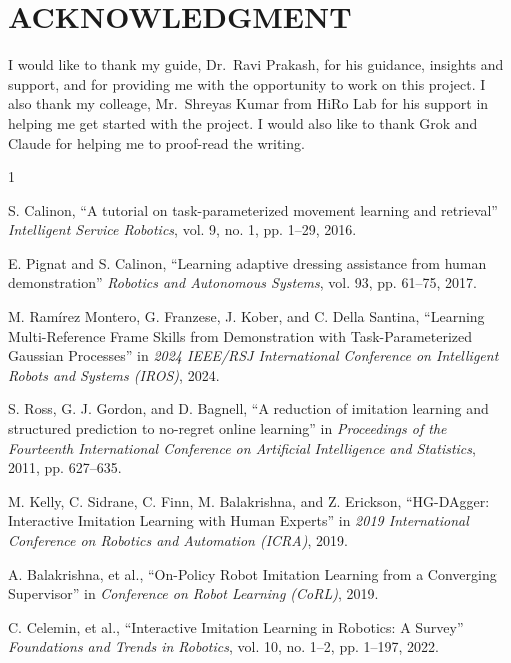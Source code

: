 \documentclass[a4paper, 10pt, conference]{ieeeconf}
\begin{document}
\addtolength{\textheight}{-12cm}

\section*{ACKNOWLEDGMENT}

I would like to thank my guide, Dr.~Ravi Prakash, for his guidance, insights and support, and for providing me with the opportunity to work on this project. I also thank my colleage, Mr.~Shreyas Kumar from HiRo Lab for his support in helping me get started with the project.
I would also like to thank Grok and Claude for helping me to proof-read the writing.

\begin{thebibliography}{1}

    S. Calinon, ``A tutorial on task-parameterized movement learning and retrieval'' \emph{Intelligent Service Robotics}, vol. 9, no. 1, pp. 1--29, 2016.

    E. Pignat and S. Calinon, ``Learning adaptive dressing assistance from human demonstration'' \emph{Robotics and Autonomous Systems}, vol. 93, pp. 61--75, 2017.

    M. Ramírez Montero, G. Franzese, J. Kober, and C. Della Santina, ``Learning Multi-Reference Frame Skills from Demonstration with Task-Parameterized Gaussian Processes'' in \emph{2024 IEEE/RSJ International Conference on Intelligent Robots and Systems (IROS)}, 2024.

    S. Ross, G. J. Gordon, and D. Bagnell, ``A reduction of imitation learning and structured prediction to no-regret online learning'' in \emph{Proceedings of the Fourteenth International Conference on Artificial Intelligence and Statistics}, 2011, pp. 627--635.

    M. Kelly, C. Sidrane, C. Finn, M. Balakrishna, and Z. Erickson, ``HG-DAgger: Interactive Imitation Learning with Human Experts'' in \emph{2019 International Conference on Robotics and Automation (ICRA)}, 2019.

    A. Balakrishna, et al., ``On-Policy Robot Imitation Learning from a Converging Supervisor'' in \emph{Conference on Robot Learning (CoRL)}, 2019.

    C. Celemin, et al., ``Interactive Imitation Learning in Robotics: A Survey'' \emph{Foundations and Trends in Robotics}, vol. 10, no. 1--2, pp. 1--197, 2022.


\end{thebibliography}
\end{document}
